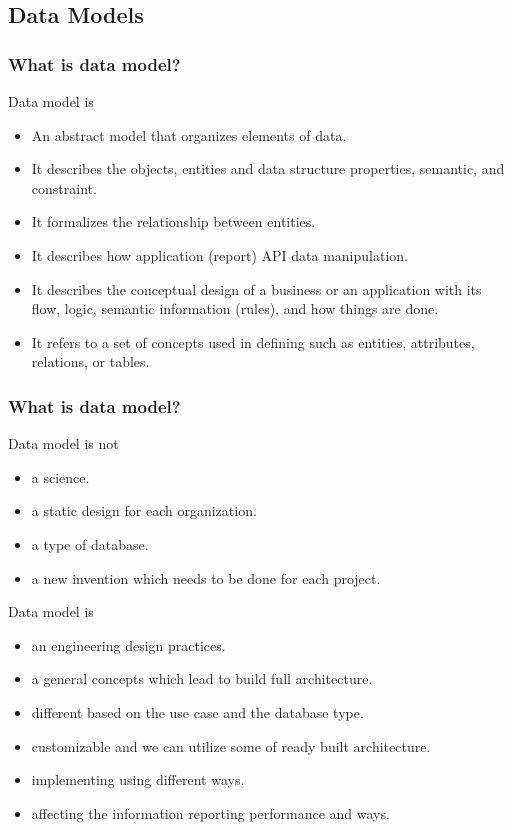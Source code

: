 \subsection{Data Models}
\begin{frame}
\frametitle{What is data model?}
Data model is
\begin{itemize}[<+->]
	\item An abstract model that organizes elements of data.
	\item It describes the objects, entities and data structure properties, semantic, and constraint.
	\item It formalizes the relationship between entities.
	\item It describes how application (report) API data manipulation.
	\item It describes the conceptual design of a business or an application with its flow, logic, semantic information (rules), and how things are done.
	\item It refers to a set of concepts used in defining such as entities, attributes, relations, or tables.
\end{itemize}
\end{frame}

\begin{frame}
\frametitle{What is data model?}

Data model is not	
\begin{itemize}
	\item a science.
	\item a static design for each organization.
	\item a type of database.
	\item a new invention which needs to be done for each project.
\end{itemize}


Data model is		
\begin{itemize}
	\item an engineering design practices.
	\item a general concepts which lead to build full architecture.
	\item different based on the use case and the database type.
	\item customizable and we can utilize some of ready built architecture. 
	\item implementing using different ways.
	\item affecting the information reporting performance and ways.
\end{itemize}

\end{frame}

